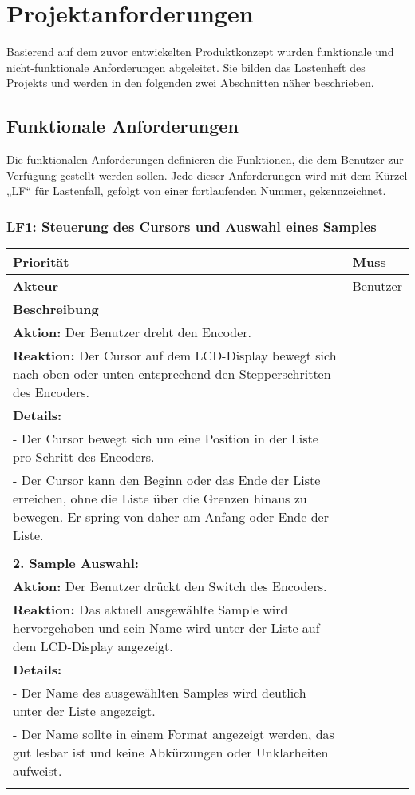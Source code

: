 \newpage
\section{Projektanforderungen}

Basierend auf dem zuvor entwickelten Produktkonzept wurden funktionale und nicht-funktionale Anforderungen abgeleitet. Sie bilden das Lastenheft des Projekts und werden in den folgenden zwei Abschnitten näher beschrieben.

\subsection{Funktionale Anforderungen}
Die funktionalen Anforderungen definieren die Funktionen, die dem Benutzer zur Verfügung gestellt werden sollen. Jede dieser Anforderungen wird mit dem Kürzel „LF“ für Lastenfall, gefolgt von einer fortlaufenden Nummer, gekennzeichnet.

\subsubsection{LF1: Steuerung des Cursors und Auswahl eines Samples}

\begin{longtable}[c]{|p{3cm}|p{13cm}|}
\hline
\textbf{Priorität} & Muss \\
\hline
\textbf{Akteur} & Benutzer \\
\hline
\textbf{Beschreibung} & 
\begin{tabularx}{13cm}{X}
\textbf{1. Cursor Bewegung:} \\
\textbf{Aktion:} Der Benutzer dreht den Encoder. \\
\textbf{Reaktion:} Der Cursor auf dem LCD-Display bewegt sich nach oben oder unten entsprechend den Stepperschritten des Encoders. \\
\textbf{Details:} \\
- Der Cursor bewegt sich um eine Position in der Liste pro Schritt des Encoders. \\
- Der Cursor kann den Beginn oder das Ende der Liste erreichen, ohne die Liste über die Grenzen hinaus zu bewegen. Er spring von daher am Anfang oder Ende der Liste. \\
\\
\textbf{2. Sample Auswahl:} \\
\textbf{Aktion:} Der Benutzer drückt den Switch des Encoders. \\
\textbf{Reaktion:} Das aktuell ausgewählte Sample wird hervorgehoben und sein Name wird unter der Liste auf dem LCD-Display angezeigt. \\
\textbf{Details:} \\
- Der Name des ausgewählten Samples wird deutlich unter der Liste angezeigt. \\
- Der Name sollte in einem Format angezeigt werden, das gut lesbar ist und keine Abkürzungen oder Unklarheiten aufweist. \\
\end{tabularx} \\
\hline
\end{longtable}

